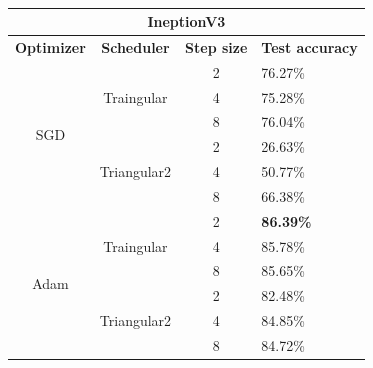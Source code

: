 \begin{table}[ht!]
\centering
\caption{}
\label{tab:my-table}
\begin{tabular}{|ccll|}
\hline
\multicolumn{4}{|c|}{\textbf{IneptionV3}}                                          \\ \hline
\multicolumn{1}{|c|}{\textbf{Optimizer}}    & \multicolumn{1}{c|}{\textbf{Scheduler}}           & \multicolumn{1}{c|}{\textbf{Step size}} & \textbf{Test accuracy} \\ \hline
\multicolumn{1}{|c|}{\multirow{6}{*}{SGD}}  & \multicolumn{1}{c|}{\multirow{3}{*}{Traingular}}  & \multicolumn{1}{c|}{2}                  &  76.27\%                \\ \cline{3-4} 
\multicolumn{1}{|c|}{} & \multicolumn{1}{c|}{} & \multicolumn{1}{c|}{4} & 75.28\% \\ \cline{3-4} 
\multicolumn{1}{|c|}{} & \multicolumn{1}{c|}{} & \multicolumn{1}{c|}{8} & 76.04\% \\ \cline{2-4} 
\multicolumn{1}{|c|}{}                      & \multicolumn{1}{c|}{\multirow{3}{*}{Triangular2}} & \multicolumn{1}{c|}{2}                  &  26.63\%               \\ \cline{3-4} 
\multicolumn{1}{|c|}{} & \multicolumn{1}{c|}{} & \multicolumn{1}{c|}{4} & 50.77\% \\ \cline{3-4} 
\multicolumn{1}{|c|}{} & \multicolumn{1}{c|}{} & \multicolumn{1}{c|}{8} & 66.38\% \\ \hline
\multicolumn{1}{|c|}{\multirow{6}{*}{Adam}} & \multicolumn{1}{c|}{\multirow{3}{*}{Traingular}}  & \multicolumn{1}{c|}{2}                  & \textbf{86.39\%}       \\ \cline{3-4} 
\multicolumn{1}{|c|}{} & \multicolumn{1}{c|}{} & \multicolumn{1}{c|}{4} & 85.78\% \\ \cline{3-4} 
\multicolumn{1}{|c|}{} & \multicolumn{1}{c|}{} & \multicolumn{1}{c|}{8} & 85.65\% \\ \cline{2-4} 
\multicolumn{1}{|c|}{}                      & \multicolumn{1}{c|}{\multirow{3}{*}{Triangular2}} & \multicolumn{1}{c|}{2}                  & 82.48\%                \\ \cline{3-4} 
\multicolumn{1}{|c|}{} & \multicolumn{1}{c|}{} & \multicolumn{1}{c|}{4} & 84.85\% \\ \cline{3-4} 
\multicolumn{1}{|c|}{} & \multicolumn{1}{c|}{} & \multicolumn{1}{c|}{8} & 84.72\% \\ \hline
\end{tabular}
\end{table}



